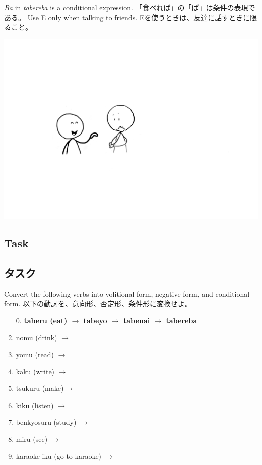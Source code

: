 \documentclass[uplatex,dvipdfmx,b5paper,english,10pt]{jsbook}
\begin{document}
\begin{toianswer}
\ifEnglish
{\it Ba\/} in {\it tabereba\/} is a conditional expression.
\else
「食べれば」の「ば」は条件の表現である。
\fi
\ifEnglish
Use E only when talking to friends.
\else
Eを使うときは、友達に話すときに限ること。
\fi
\end{toianswer}

\vspace*{-10\baselineskip}
\begin{flushright}
\includegraphics[trim=170 200 400 200, clip, width=.3\hsize]{img/sureba.png}
\end{flushright}
\vspace*{2\baselineskip}

\ifEnglish
\subsection{Task}
\else
\subsection{タスク}
\fi

\begin{toiquestion}
\ifEnglish
Convert the following verbs into volitional form, negative form, and conditional form.
\else
以下の動詞を、意向形、否定形、条件形に変換せよ。
\fi
\end{toiquestion}

\begin{enumerate}
 \item[0.] {\bfseries taberu (eat) $\rightarrow$ tabeyo $\rightarrow$ tabenai $\rightarrow$ tabereba}
 \item nomu (drink)  $\rightarrow$ \hrulefill
 \item yomu (read)   $\rightarrow$ \hrulefill
 \item kaku (write)  $\rightarrow$ \hrulefill
 \item tsukuru (make)$\rightarrow$ \hrulefill
 \item kiku (listen) $\rightarrow$ \hrulefill
 \item benkyosuru (study) $\rightarrow$ \hrulefill
 \item miru (see)    $\rightarrow$ \hrulefill
 \item karaoke iku (go to karaoke) $\rightarrow$ \hrulefill
\end{enumerate}
\end{document}

